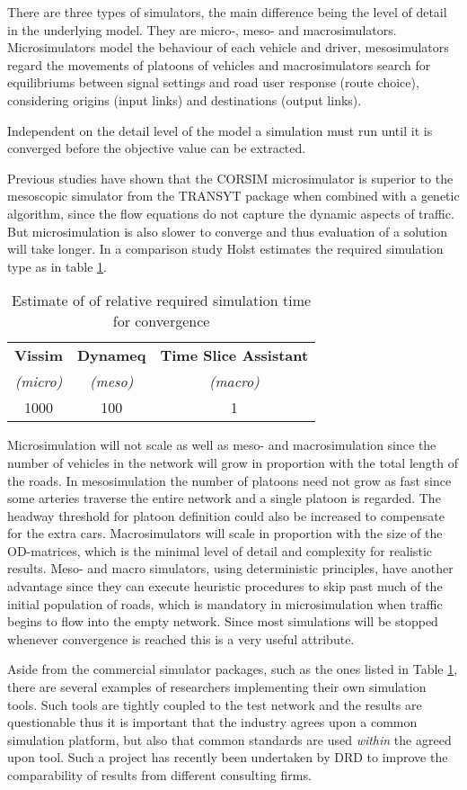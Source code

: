 There are three types of simulators, the main difference being the level of detail in the underlying model. They are micro-, meso- and macrosimulators. Microsimulators model the behaviour of each vehicle and driver, mesosimulators regard the movements of platoons of vehicles and macrosimulators search for equilibriums between signal settings and road user response (route choice), considering origins (input links) and destinations (output links).

Independent on the detail level of the model a simulation must run until it is converged before the objective value can be extracted. 

Previous studies have shown that the CORSIM microsimulator is superior to the mesoscopic simulator from the TRANSYT package when combined with a genetic algorithm, since the flow equations do not capture the dynamic aspects of traffic. But microsimulation is also slower to converge and thus evaluation of a solution will take longer. In a comparison study \cite{simcompare} Holst estimates the required simulation type as in table \ref{tab:convergespeed}.

\begin{table}[ht]
\centering
\begin{tabular}{c|c|c}
\textbf{Vissim} & \textbf{Dynameq} & \textbf{Time Slice Assistant} \\
\textit{(micro)} & \textit{(meso)} & \textit{(macro)} \\ \hline
1000 & 100 & 1
\end{tabular}
\caption{Estimate of of relative required simulation time for convergence}
\label{tab:convergespeed}
\end{table}

Microsimulation will not scale as well as meso- and macrosimulation since the number of vehicles in the network will grow in proportion with the total length of the roads. In mesosimulation the number of platoons need not grow as fast since some arteries traverse the entire network and a single platoon is regarded. The headway threshold for platoon definition could also be increased to compensate for the extra cars. Macrosimulators will scale in proportion with the size of the OD-matrices, which is the minimal level of detail and complexity for realistic results. 
Meso- and macro simulators, using deterministic principles, have another advantage since they can execute heuristic procedures to skip past much of the initial population of roads, which is mandatory in microsimulation when traffic begins to flow into the empty network. Since most simulations will be stopped whenever convergence is reached this is a very useful attribute.

Aside from the commercial simulator packages, such as the ones listed in Table \ref{tab:convergespeed}, there are several examples of researchers implementing their own simulation tools. Such tools are tightly coupled to the test network and the results are questionable thus it is important that the industry agrees upon a common simulation platform, but also that common standards are used \textit{within} the agreed upon tool. Such a project has recently been undertaken by DRD to improve the comparability of results from different consulting firms.

